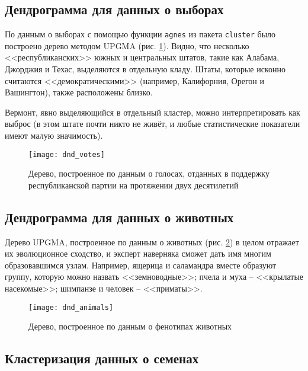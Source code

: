 \documentclass[a4paper,12pt]{article} %
\newcommand{\myPictWidth}{.95\textwidth}
\begin{document}
\newpage
\subsection{Дендрограмма для данных о выборах}

По данным о выборах с помощью функции \texttt{agnes} из пакета \texttt{cluster} было построено дерево методом UPGMA (рис.  \ref{fig:dnd_votes}). Видно, что несколько <<республиканских>> южных и центральных штатов, такие как Алабама, Джорджия и Техас, выделяются в отдельную кладу. Штаты, которые исконно считаются <<демократическими>> (например, Калифорния, Орегон и Вашингтон), также расположены близко.

Вермонт, явно выделяющийся в отдельный кластер, можно интерпретировать как выброс (в этом штате почти никто не живёт, и любые статистические показатели имеют малую значимость).

\begin{figure}[H]
    \centering \texttt{[image: dnd\_votes]}
    \caption{Дерево, построенное по данным о голосах, отданных в поддержку республиканской партии на протяжении двух десятилетий}
    \label{fig:dnd_votes}
\end{figure}

\subsection{Дендрограмма для данных о животных}

Дерево UPGMA, построенное по данным о животных (рис. \ref{fig:dnd_animals}) в целом отражает их эволюционное сходство, и эксперт наверняка сможет дать имя многим образовавшимся узлам. Например, ящерица и саламандра вместе образуют группу, которую можно назвать <<земноводные>>; пчела и муха -- <<крылатые насекомые>>; шимпанзе и человек -- <<приматы>>.

\begin{figure}[H]
    \centering \texttt{[image: dnd\_animals]}
    \caption{Дерево, построенное по данным о фенотипах животных}
    \label{fig:dnd_animals}
\end{figure}

\newpage
\subsection{Кластеризация данных о семенах}
\end{document}
